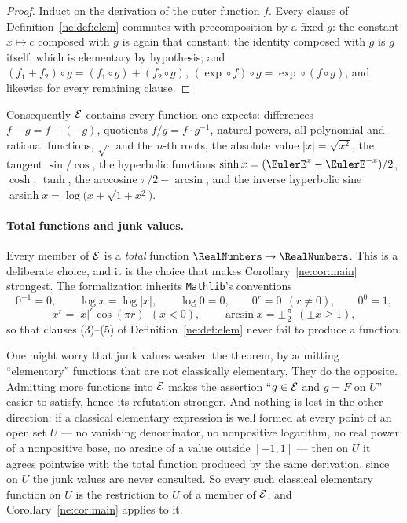\begin{proof}
Induct on the derivation of the outer function $f$.  Every clause of
Definition~\ref{ne:def:elem} commutes with precomposition by a fixed $g$: the constant
$x\mapsto c$ composed with $g$ is again that constant; the identity composed
with $g$ is $g$ itself, which is elementary by hypothesis; and
$(f_1+f_2)\circ g=(f_1\circ g)+(f_2\circ g)$, $(\exp\circ f)\circ
g=\exp\circ(f\circ g)$, and likewise for every remaining clause.
\end{proof}

Consequently $\mathcal E$ contains every function one expects: differences
$f-g=f+(-g)$, quotients $f/g=f\cdot g^{-1}$, natural powers, all polynomial
and rational functions, $\sqrt{\cdot}$ and the $n$-th roots,
the absolute value $|x|=\sqrt{x^2}$, the tangent $\sin/\cos$, the hyperbolic
functions $\sinh x=(\EulerE^x-\EulerE^{-x})/2$, $\cosh$, $\tanh$, the arccosine
$\pi/2-\arcsin$, and the inverse hyperbolic sine
$\operatorname{arsinh}x=\log\bigl(x+\sqrt{1+x^2}\bigr)$.

\paragraph{Total functions and junk values.}
Every member of $\mathcal E$ is a \emph{total} function $\RealNumbers\to\RealNumbers$.  This is a
deliberate choice, and it is the choice that makes Corollary~\ref{ne:cor:main} strongest.
The formalization inherits \texttt{Mathlib}'s conventions
\[
  0^{-1}=0,\qquad \log x=\log|x|,\qquad \log 0=0,\qquad
  0^{r}=0\ \ (r\ne 0),\qquad 0^{0}=1,
\]
\[
  x^{r}=|x|^{r}\cos(\pi r)\ \ (x<0),\qquad
  \arcsin x=\pm\tfrac{\pi}{2}\ \ (\pm x\ge 1),
\]
so that clauses (3)--(5) of Definition~\ref{ne:def:elem} never fail to produce a function.

\begin{boxedremark}
One might worry that junk values weaken the theorem, by admitting
``elementary'' functions that are not classically elementary.  They do the
opposite.  Admitting more functions into $\mathcal E$ makes the assertion ``$g\in
\mathcal E$ and $g=F$ on $U$'' easier to satisfy, hence its refutation
stronger.  And nothing is lost in the other direction: if a classical
elementary expression is well formed at every point of an open set $U$ --- no
vanishing denominator, no nonpositive logarithm, no real power of a
nonpositive base, no arcsine of a value outside $[-1,1]$ --- then on $U$ it
agrees pointwise with the total function produced by the same derivation,
since on $U$ the junk values are never consulted.  So every such classical
elementary function on $U$ is the restriction to $U$ of a member of $\mathcal E$,
and Corollary~\ref{ne:cor:main} applies to it.
\end{boxedremark}

